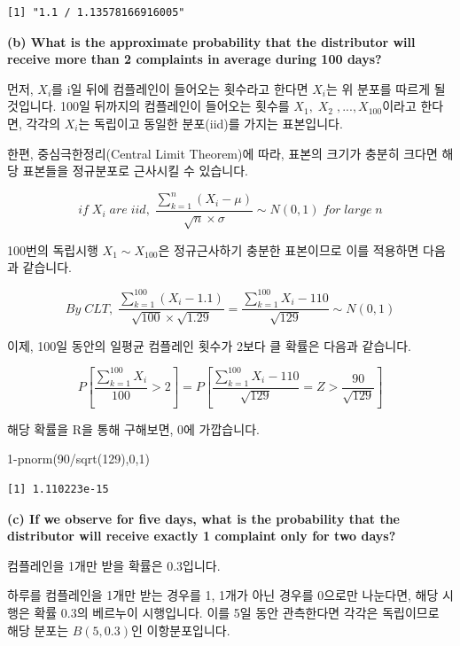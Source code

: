 \documentclass[
  letterpaper,
  DIV=11,
  numbers=noendperiod]{scrreprt}
\newenvironment{Shaded}{\begin{snugshade}}{\end{snugshade}}
\newcommand{\DecValTok}[1]{\textcolor[rgb]{0.68,0.00,0.00}{#1}}
\newcommand{\FunctionTok}[1]{\textcolor[rgb]{0.28,0.35,0.67}{#1}}
\newcommand{\NormalTok}[1]{\textcolor[rgb]{0.00,0.23,0.31}{#1}}
\newcommand{\SpecialCharTok}[1]{\textcolor[rgb]{0.37,0.37,0.37}{#1}}
\begin{document}
\begin{verbatim}
[1] "1.1 / 1.13578166916005"
\end{verbatim}

\textbf{(b) What is the approximate probability that the distributor
will receive more than 2 complaints in average during 100 days?}

먼저, \(X_i\)를 i일 뒤에 컴플레인이 들어오는 횟수라고 한다면 \(X_i\)는
위 분포를 따르게 될 것입니다. 100일 뒤까지의 컴플레인이 들어오는 횟수를
\(X_1,\;X_2\;,...,X_{100}\)이라고 한다면, 각각의 \(X_i\)는 독립이고
동일한 분포(iid)를 가지는 표본입니다.

한편, 중심극한정리(Central Limit Theorem)에 따라, 표본의 크기가 충분히
크다면 해당 표본들을 정규분포로 근사시킬 수 있습니다.

\[if\;X_i\;are\;iid,\;\frac{\sum_{k=1}^{n}(X_i-\mu)}{\sqrt{n}\times\sigma}\sim N(0,1)\;for\;large\;n\]

100번의 독립시행 \(X_1\sim X_{100}\)은 정규근사하기 충분한 표본이므로
이를 적용하면 다음과 같습니다.

\[By\;CLT,\;\frac{\sum_{k=1}^{100}(X_i-1.1)}{\sqrt{100}\times\sqrt{1.29}}=\frac{\sum_{k=1}^{100}X_i-110}{\sqrt{129}}\sim N(0,1)\]

이제, 100일 동안의 일평균 컴플레인 횟수가 2보다 클 확률은 다음과
같습니다.

\[P[\frac{\sum_{k=1}^{100}X_i}{100}>2]=P[\frac{\sum_{k=1}^{100}X_i-110}{\sqrt{129}}=Z>\frac{90}{\sqrt{129}}]\]

해당 확률을 R을 통해 구해보면, 0에 가깝습니다.

\begin{Shaded}
\begin{Highlighting}[]
\DecValTok{1}\SpecialCharTok{{-}}\FunctionTok{pnorm}\NormalTok{(}\DecValTok{90}\SpecialCharTok{/}\FunctionTok{sqrt}\NormalTok{(}\DecValTok{129}\NormalTok{),}\DecValTok{0}\NormalTok{,}\DecValTok{1}\NormalTok{)}
\end{Highlighting}
\end{Shaded}

\begin{verbatim}
[1] 1.110223e-15
\end{verbatim}

\textbf{(c) If we observe for five days, what is the probability that
the distributor will receive exactly 1 complaint only for two days?}

컴플레인을 1개만 받을 확률은 0.3입니다.

하루를 컴플레인을 1개만 받는 경우를 1, 1개가 아닌 경우를 0으로만
나눈다면, 해당 시행은 확률 0.3의 베르누이 시행입니다. 이를 5일 동안
관측한다면 각각은 독립이므로 해당 분포는 \(B(5,0.3)\)인 이항분포입니다.
\end{document}
